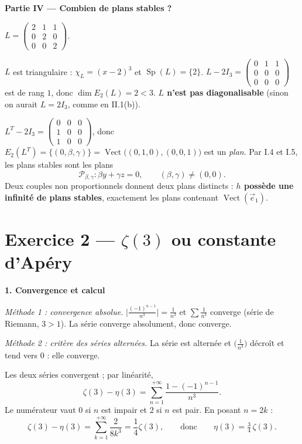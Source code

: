 \documentclass[a4paper,11pt]{article}
\numberwithin{equation}{section}
\numberwithin{figure}{section}
\numberwithin{table}{section}
\theoremstyle{enonce}
\theoremstyle{exemple}
\theoremstyle{remarque}
\newcommand{\vect}{\operatorname{Vect}}
\providecommand{\Sp}{\operatorname{Sp}}\providecommand{\Ker}{\operatorname{Ker}}\renewcommand{\Im}{\operatorname{Im}}
\newcommand{\Partie}[1]{\par\needspace{5\baselineskip}\vspace{1.1em}\noindent
  {\sffamily\bfseries\large\color{Bleu}#1}\par\vspace{2pt}{\color{Filet}\rule{\linewidth}{0.4pt}}\par\smallskip}
\newcommand{\Q}[1]{\par\needspace{3\baselineskip}\medskip\noindent{\sffamily\bfseries\color{Bleu}#1}\enspace}
\begin{document}
\Partie{Partie IV — Combien de plans stables ?}

$L=\begin{pmatrix}2&1&1\\0&2&0\\0&0&2\end{pmatrix}$.

\Q{IV.1} $L$ est triangulaire : $\chi_L=(x-2)^3$ et $\Sp(L)=\{2\}$. $L-2I_3=\begin{pmatrix}0&1&1\\0&0&0\\0&0&0\end{pmatrix}$ est de rang
$1$, donc $\dim E_2(L)=2<3$. \textbf{$L$ n'est pas diagonalisable} (sinon on aurait $L=2I_3$, comme en II.1(b)).

\Q{IV.2} $L^T-2I_3=\begin{pmatrix}0&0&0\\1&0&0\\1&0&0\end{pmatrix}$, donc $E_2(L^T)=\{(0,\beta,\gamma)\}=\vect\big((0,1,0),(0,0,1)\big)$ est un
\emph{plan}. Par I.4 et I.5, les plans stables sont les plans
\[\mathcal P_{\beta,\gamma} : \beta y+\gamma z=0,\qquad (\beta,\gamma)\neq(0,0).\]
Deux couples non proportionnels donnent deux plans distincts : \textbf{$h$ possède une infinité de plans stables}, exactement les
plans contenant $\vect(\vec e_1)$.

\section*{Exercice 2 — $\zeta(3)$ ou constante d'Apéry}

\Partie{1. Convergence et calcul}

\Q{1(a)} \emph{Méthode 1 : convergence absolue.} $\Big|\frac{(-1)^{n-1}}{n^3}\Big|=\frac1{n^3}$ et $\sum\frac1{n^3}$ converge (série de
Riemann, $3>1$). La série converge absolument, donc converge.

\emph{Méthode 2 : critère des séries alternées.} La série est alternée et $\big(\frac1{n^3}\big)$ décroît et tend vers $0$ : elle
converge.

\Q{1(b)} Les deux séries convergent ; par linéarité,
\[\zeta(3)-\eta(3)=\sum_{n=1}^{+\infty}\frac{1-(-1)^{n-1}}{n^3}.\]
Le numérateur vaut $0$ si $n$ est impair et $2$ si $n$ est pair. En posant $n=2k$ :
\[\zeta(3)-\eta(3)=\sum_{k=1}^{+\infty}\frac{2}{8k^3}=\frac14\zeta(3),\qquad\text{donc}\qquad \boxed{\eta(3)=\tfrac34\,\zeta(3).}\]
\end{document}
